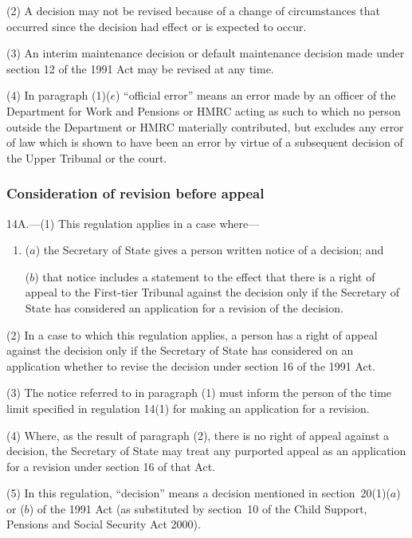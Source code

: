 \documentclass[12pt,a4paper]{article}
\begin{document}
(2) A decision may not be revised because of a change of circumstances that occurred since the decision had effect or is expected to occur.

(3) An interim maintenance decision or default maintenance decision made under section 12 of the 1991 Act may be revised at any time.

(4) In paragraph (1)($e$)  “official error” means an error made by an officer of the Department for Work and Pensions or HMRC acting as such to which no person outside the Department or HMRC materially contributed, but excludes any error of law which is shown to have been an error by virtue of a subsequent decision of the Upper Tribunal or the court.

\subsubsection[14A. Consideration of revision before appeal]{Consideration of revision before appeal}

14A.---(1)  This regulation applies in a case where—
\begin{enumerate}\item[]
($a$) the Secretary of State gives a person written notice of a decision; and

($b$) that notice includes a statement to the effect that there is a right of appeal to the First-tier Tribunal against the decision only if the Secretary of State has considered an application for a revision of the decision.
\end{enumerate}

(2) In a case to which this regulation applies, a person has a right of appeal against the decision only if the Secretary of State has considered on an application whether to revise the decision under section 16 of the 1991 Act.

(3) The notice referred to in paragraph (1) must inform the person of the time limit specified in regulation 14(1) for making an application for a revision.

(4) Where, as the result of paragraph (2), there is no right of appeal against a decision, the Secretary of State may treat any purported appeal as an application for a revision under section 16 of that Act.

(5) In this regulation, “decision” means a decision mentioned in section~20(1)($a$)  or ($b$)  of the 1991 Act (as substituted by section~10 of the Child Support, Pensions and Social Security Act 2000).
\end{document}
